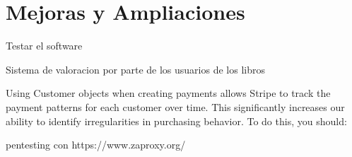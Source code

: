 \chapter{Mejoras y Ampliaciones}
    Testar el software
    
    Sistema de valoracion por parte de los usuarios de los libros
    
    Using Customer objects when creating payments allows Stripe to track the payment patterns for each customer over time. This significantly increases our ability to identify irregularities in purchasing behavior. To do this, you should:
    
    pentesting con https://www.zaproxy.org/